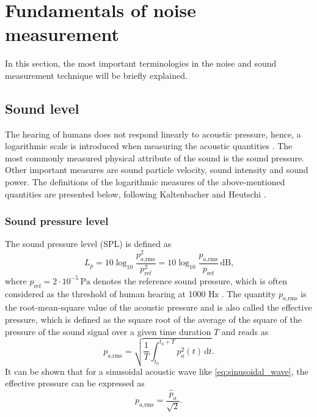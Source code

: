 \newpage
\section{Fundamentals of noise measurement}

In this section, the most important terminologies in the noise and sound measurement technique will be briefly explained.

\subsection{Sound level}

The hearing of humans does not respond linearly to acoustic pressure, hence, a logarithmic scale is introduced when measuring the acoustic quantities \cite{fahy_foundations_2001}. The most commonly measured physical attribute of the sound is the sound pressure. Other important measures are sound particle velocity, sound intensity and sound power. The definitions of the logarithmic measures of the above-mentioned quantities are presented below, following Kaltenbacher \cite{kaltenbacher_computational_2018} and Heutschi \cite{heutschi_lecture_2016}.


\subsubsection*{Sound pressure level}
The sound pressure level (SPL) is defined as
\begin{equation}
	L_p = 10\log_{10}\frac{p_{a\text{,rms}}^2}{p_\text{ref}^2} = 10\log_{10}\frac{p_{a\text{,rms}}}{p_\text{ref}}\,\text{dB}\text{,}
\end{equation}
where $p_\text{ref} = 2\cdot10^{-5}\,\text{Pa}$ denotes the reference sound pressure, which is often considered as the threshold of human hearing at 1000 Hz \cite{sinambari_ingenieurakustik_2020}. The quantity $p_{a\text{,rms}}$ is the root-mean-square value of the acoustic pressure and is also called the effective pressure, which is defined as the square root of the average of the square of the pressure of the sound signal over a given time duration $T$ and reads as
\begin{equation}
	p_{a\text{,rms}} = \sqrt{\frac{1}{T} \int_{t_0}^{t_0 + T} p_a^2(t)\,\text{d}t}\text{.}
\end{equation}
It can be shown that for a sinusoidal acoustic wave like \cref{eq:sinusoidal_wave}, the effective pressure can be expressed as \cite{peterson_1972_handbook}
\begin{equation}
	p_{a\text{,rms}} = \frac{\hat{p}_a}{\sqrt{2}}\text{.}
\end{equation}


